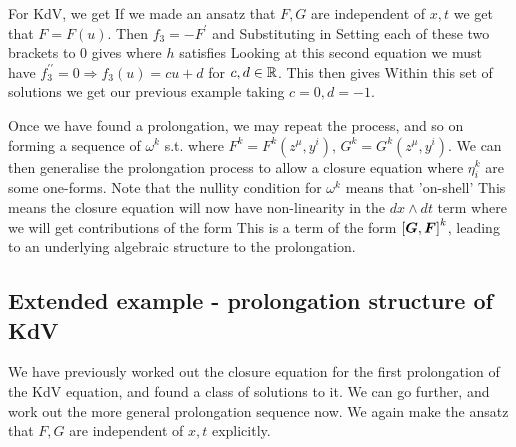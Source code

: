 \documentclass{article}
\begin{document}
\begin{example}
	For KdV, we get 
If we made an ansatz that $F,G$ are independent of $x,t$ we get that $F= F(u)$. Then $f_3 = -F^\prime$ and 
Substituting in 
Setting each of these two brackets to 0 gives 
where $h$ satisfies 
Looking at this second equation we must have $f_3^{\prime\prime}=0 \Rightarrow f_3(u) = cu+d$ for $c,d \in \mbb{R}$.  This then gives 
Within this set of solutions we get our previous example taking $c=0,d=-1$. 
\end{example}

Once we have found a prolongation, we may repeat the process, and so on forming a sequence of $\omega^k$ s.t. 
where $F^k = F^k(z^\mu,y^i), \, G^k = G^k(z^\mu,y^i)$. We can then generalise the prolongation process to allow a closure equation 
where $\eta^k_i$ are some one-forms. Note that the nullity condition for $\omega^k$ means that 'on-shell'
This means the closure equation will now have non-linearity in the $dx\wedge dt$ term where we will get contributions of the form 
This is a term of the form $\comm[\bm{G}]{\bm{F}}^k$, leading to an underlying algebraic structure to the prolongation. 
\subsection{Extended example - prolongation structure of KdV}
We have previously worked out the closure equation for the first prolongation of the KdV equation, and found a class of solutions to it. We can go further, and work out the more general prolongation sequence now. We again make the ansatz that $F,G$ are independent of $x,t$ explicitly. 
\end{document}
